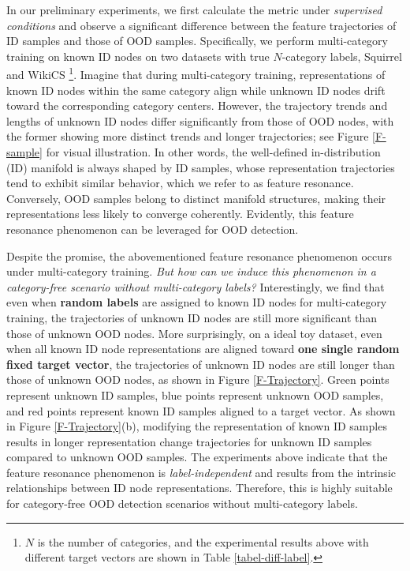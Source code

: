 In our preliminary experiments, we first calculate the metric under \textit{supervised conditions} and observe a significant difference between the feature trajectories of ID samples and those of OOD samples. Specifically, we perform multi-category training on known ID nodes on two datasets with true $N$-category labels, Squirrel and WikiCS \footnote{$N$ is the number of categories, and the experimental results above with different target vectors are shown in Table \ref{tabel-diff-label}.}.
Imagine that during multi-category training, representations of known ID nodes within the same category align while unknown ID nodes drift toward the corresponding category centers. However, the trajectory trends and lengths of unknown ID nodes differ significantly from those of OOD nodes, with the former showing more distinct trends and longer trajectories; see Figure \ref{F-sample} for visual illustration. 
In other words, the well-defined in-distribution (ID) manifold is always shaped by ID samples, whose representation trajectories tend to exhibit similar behavior, which we refer to as feature resonance. Conversely, OOD samples belong to distinct manifold structures, making their representations less likely to converge coherently. Evidently, this feature resonance phenomenon can be leveraged for OOD detection.

Despite the promise, the abovementioned feature resonance phenomenon occurs under multi-category training. \textit{But how can we induce this phenomenon in a category-free scenario without multi-category labels?} 
Interestingly, we find that even when \textbf{random labels} are assigned to known ID nodes for multi-category training, the trajectories of unknown ID nodes are still more significant than those of unknown OOD nodes. More surprisingly, 
on a ideal toy dataset, 
even when all known ID node representations are aligned toward \textbf{one single random fixed target vector}, the trajectories of unknown ID nodes are still longer than those of unknown OOD nodes, as shown in Figure \ref{F-Trajectory}. 
Green points represent unknown ID samples, blue points represent unknown OOD samples, and red points represent known ID samples aligned to a target vector. As shown in Figure \ref{F-Trajectory}(b), modifying the representation of known ID samples results in longer representation change trajectories for unknown ID samples compared to unknown OOD samples.
The experiments above indicate that the feature resonance phenomenon is \textit{label-independent} and results from the intrinsic relationships between ID node representations. Therefore, this is highly suitable for category-free OOD detection scenarios without multi-category labels.
 

